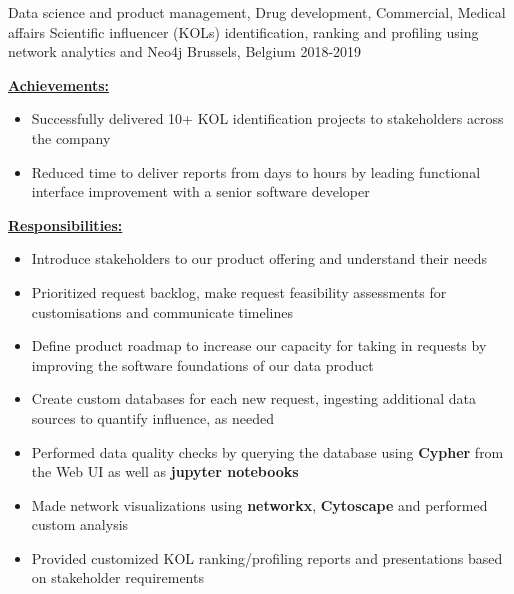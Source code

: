 \begin{cventries}
    \cventry
    {Data science and product management, Drug development, Commercial, Medical affairs} %
    {Scientific influencer (KOLs) identification, ranking and profiling using network analytics and Neo4j} %
    {Brussels, Belgium} %
    {2018-2019} %
    {
     \begin{cvitems}
        \item {\underline{\textbf{Achievements:}}}
            \begin{itemize}
                \item Successfully delivered 10+ KOL identification projects to stakeholders across the company 
                \item Reduced time to deliver reports from days to hours by leading functional interface improvement with a senior software developer
            \end{itemize}
        \item {\underline{\textbf{Responsibilities:}}}
            \begin{itemize}
                \item Introduce stakeholders to our product offering and understand their needs
                \item Prioritized request backlog, make request feasibility assessments for customisations and communicate timelines 
                \item Define product roadmap to increase our capacity for taking in requests by improving the software foundations of our data product
                \item Create custom databases for each new request, ingesting additional data sources to quantify influence, as needed
                \item Performed data quality checks by querying the database using \textbf{Cypher} from the Web UI as well as \textbf{jupyter notebooks}
                \item Made network visualizations using \textbf{networkx}, \textbf{Cytoscape} and performed custom analysis
                \item Provided customized KOL ranking/profiling reports and presentations based on stakeholder requirements
            \end{itemize}    
    \end{cvitems}
    }
\vspace{2mm}


\end{cventries}
